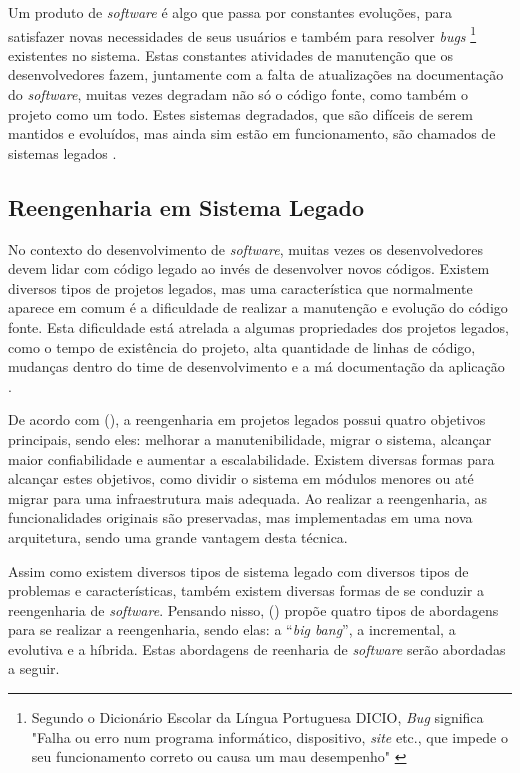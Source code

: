 Um produto de \textit{software} é algo que passa por constantes evoluções, para satisfazer novas necessidades de seus usuários e 
também para resolver \textit{bugs} \footnote{Segundo o Dicionário Escolar da Língua Portuguesa DICIO, \textit{Bug} significa "Falha 
ou erro num programa informático, dispositivo, \textit{site} etc., que impede o seu funcionamento correto ou causa um mau desempenho" 
\cite{dicio2020online}} existentes no sistema. Estas constantes atividades de manutenção que os desenvolvedores fazem, juntamente com 
a falta de atualizações na documentação do \textit{software}, muitas vezes degradam não só o código fonte, como também o projeto como 
um todo. Estes sistemas degradados, que são difíceis de serem mantidos e evoluídos, mas ainda sim estão em funcionamento, são chamados 
de sistemas legados \cite{cagnin2005parfait}.

\subsection{Reengenharia em Sistema Legado}

No contexto do desenvolvimento de \textit{software}, muitas vezes os desenvolvedores devem lidar com código legado ao invés de desenvolver 
novos códigos. Existem diversos tipos de projetos legados, mas uma característica que normalmente aparece em comum é a dificuldade 
de realizar a manutenção e evolução do código fonte. Esta dificuldade está atrelada a algumas propriedades dos projetos legados, como 
o tempo de existência do projeto, alta quantidade de linhas de código, mudanças dentro do time de desenvolvimento e a má documentação da 
aplicação \cite{birchall2016re}.

De acordo com  (\citeyear{sneed1995planning}), a reengenharia em projetos legados possui quatro objetivos principais, sendo eles: melhorar a manutenibilidade, 
migrar o sistema, alcançar maior confiabilidade e aumentar a escalabilidade. Existem diversas formas para alcançar estes 
objetivos, como dividir o sistema em módulos menores ou até migrar para uma infraestrutura mais adequada. Ao realizar a reengenharia, 
as funcionalidades originais são preservadas, mas implementadas em uma nova arquitetura, sendo uma grande vantagem desta técnica.

Assim como existem diversos tipos de sistema legado com diversos tipos de problemas e características, também existem diversas formas de 
se conduzir a reengenharia de \textit{software}. Pensando nisso,  (\citeyear{rosenberg1996software}) 
propõe quatro tipos de abordagens para se realizar a reengenharia, sendo elas: a “\textit{big bang}”, a incremental, a evolutiva e a híbrida. 
Estas abordagens de reenharia de \textit{software} serão abordadas a seguir.

